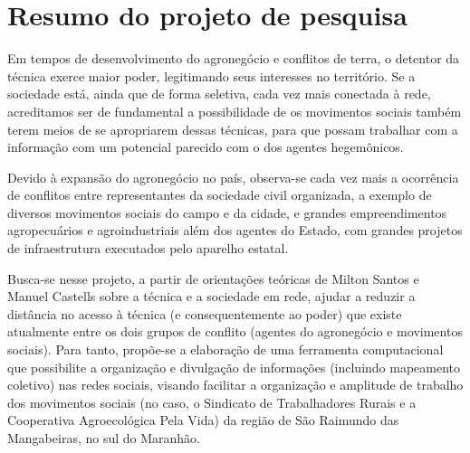 
\section{Resumo do projeto de pesquisa}

Em tempos de desenvolvimento do agronegócio e conflitos de terra, o detentor da técnica exerce maior poder, legitimando seus interesses no território. Se a sociedade está, ainda que de forma seletiva, cada vez mais conectada à rede, acreditamos ser de fundamental a possibilidade de os movimentos sociais também terem meios de se apropriarem dessas técnicas, para que possam trabalhar com a informação com um potencial parecido com o dos agentes hegemônicos.

Devido à expansão do agronegócio no país, observa-se cada vez mais a ocorrência de  conflitos entre representantes da sociedade civil organizada, a exemplo de diversos movimentos sociais do campo e da cidade, e grandes empreendimentos agropecuários e agroindustriais além dos agentes do Estado, com  grandes projetos de infraestrutura executados pelo aparelho estatal.

Busca-se nesse projeto, a partir de orientações teóricas de Milton Santos e Manuel Castells sobre a técnica e a sociedade em rede, ajudar a reduzir a distância no acesso à técnica (e consequentemente ao poder) que existe atualmente entre os dois grupos de conflito (agentes do agronegócio e movimentos sociais). Para tanto, propõe-se a elaboração de uma ferramenta computacional que possibilite a organização e divulgação de informações (incluindo mapeamento coletivo) nas redes sociais, visando facilitar a organização e amplitude de trabalho dos movimentos sociais (no caso, o Sindicato de Trabalhadores Rurais e a Cooperativa Agroecológica Pela Vida) da região de São Raimundo das Mangabeiras, no sul do Maranhão.



